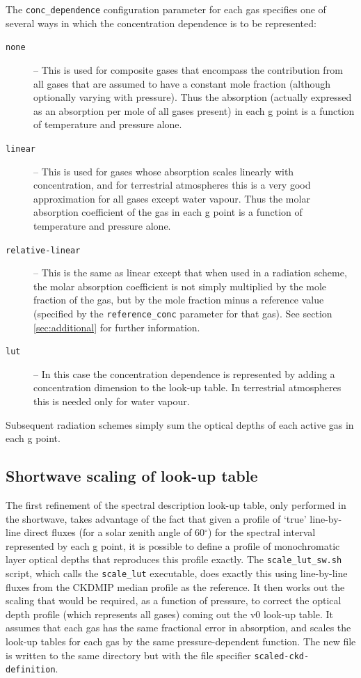 \documentclass[a4,oneside]{article}
\def\codesize{\small}
\def\codesize{\small}
\def\code#1{{\codesize\texttt{#1}}}
\begin{document}
The \code{conc\_dependence} configuration parameter for each gas
specifies one of several ways in which the concentration dependence is
to be represented:
\begin{description}
\item[\code{none}] -- This is used for composite gases that encompass
  the contribution from all gases that are assumed to have a constant
  mole fraction (although optionally varying with pressure). Thus the
  absorption (actually expressed as an absorption per mole of all
  gases present) in each g point is a function of temperature and
  pressure alone.
\item[\code{linear}] -- This is used for gases whose absorption scales
  linearly with concentration, and for terrestrial atmospheres this is
  a very good approximation for all gases except water vapour. Thus
  the molar absorption coefficient of the gas in each g point is a
  function of temperature and pressure alone.
\item[\code{relative-linear}] -- This is the same as linear except
  that when used in a radiation scheme, the molar absorption
  coefficient is not simply multiplied by the mole fraction of the
  gas, but by the mole fraction minus a reference value (specified by
  the \code{reference\_conc} parameter for that gas). See section
  \ref{sec:additional} for further information.
\item[\code{lut}] -- In this case the concentration dependence is
  represented by adding a concentration dimension to the look-up
  table. In terrestrial atmospheres this is needed only for water
  vapour.
\end{description}
Subsequent radiation schemes simply sum the optical depths of each
active gas in each g point.

\subsection{Shortwave scaling of look-up table}
The first refinement of the spectral description look-up table, only
performed in the shortwave, takes advantage of the fact that given a
profile of `true' line-by-line direct fluxes (for a solar zenith angle
of 60$^\circ$) for the spectral interval represented by each g point,
it is possible to define a profile of monochromatic layer optical
depths that reproduces this profile exactly. The
\code{scale\_lut\_sw.sh} script, which calls the \code{scale\_lut}
executable, does exactly this using line-by-line fluxes from the
CKDMIP median profile as the reference.  It then works out the scaling
that would be required, as a function of pressure, to correct the
optical depth profile (which represents all gases) coming out the v0
look-up table. It assumes that each gas has the same fractional error
in absorption, and scales the look-up tables for each gas by the same
pressure-dependent function. The new file is written to the same
directory but with the file specifier \code{scaled-ckd-definition}.
\end{document}
